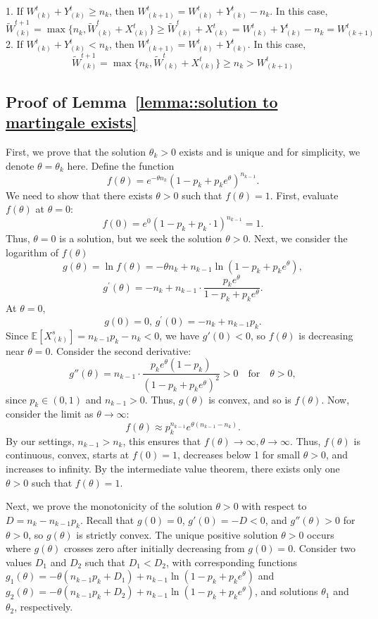 \documentclass[preprint]{article}
\theoremstyle{plain}
\theoremstyle{definition}
\theoremstyle{remark}
\begin{document}
1. If $ W^t_{(k)}+ Y^t_{(k)}\geq n_k $, then $W^t_{(k+1)}= W^{t}_{(k)}+Y^t_{(k)}  -  n_k $. In this case, 
$$ \tilde{W}^{t+1}_{(k)}=  \max\{ n_{k},\tilde{W}^{t}_{(k)} + X^t_{(k)}\} \geq \tilde{W}^{t}_{(k)} + X^t_{(k)}={W}^{t}_{(k)} + Y^t_{(k)}-n_k=W^t_{(k+1)}$$
2. If $ W^t_{(k)}+ Y^t_{(k)}<n_k $, then $W^t_{(k+1)}= W^{t}_{(k)}+Y^t_{(k)}$. In this case, 
$$\tilde{W}^{t+1}_{(k)}=  \max\{ n_{k},\tilde{W}^{t}_{(k)} + X^t_{(k)}\} \geq n_{k}> W^t_{(k+1)}$$

\subsection{Proof of Lemma~\ref{lemma::solution to martingale exists}}\label{appendix_lemma::proof of solution to martingale exists}
First, we prove that the solution $\theta_k>0$ exists and is unique and for simplicity, we denote $\theta=\theta_k$ here. Define the function
\[
f(\theta) = e^{-\theta n_{k}} (1 - p_k + p_k e^{\theta})^{n_{k-1}}.
\]
We need to show that there exists \(\theta > 0\) such that \(f(\theta) = 1\). First, evaluate \(f(\theta)\) at \(\theta = 0\):
\[
f(0) = e^{0} (1 - p_k + p_k \cdot 1)^{n_{k-1}} = 1.
\]
Thus, \(\theta = 0\) is a solution, but we seek the solution \(\theta > 0\). Next, we consider the logarithm of $f(\theta)$
$$g(\theta) = \ln f(\theta) = -\theta n_{k} + n_{k-1} \ln(1 - p_k + p_k e^{\theta}),$$
$$ g^\prime(\theta) = -n_{k} + n_{k-1} \cdot \frac{p_k e^{\theta}}{1 - p_k + p_k e^{\theta}}.$$
At \(\theta = 0\),
\[
g(0)=0,\,g^\prime(0) = -n_{k} + n_{k-1} p_k.
\]
Since \(\mathbb{E}[X^s_{(k)}] = n_{k-1} p_k - n_{k} < 0\), we have \(g'(0) < 0\), so \(f(\theta)\) is decreasing near \(\theta = 0\). Consider the second derivative:
\[
g''(\theta) = n_{k-1} \cdot \frac{p_k e^{\theta} (1 - p_k)}{(1 - p_k + p_k e^{\theta})^2} > 0 \quad \text{for} \quad \theta > 0,
\]
since \(p_k \in (0, 1)\) and \(n_{k-1} > 0\). Thus, \(g(\theta)\) is convex, and so is \(f(\theta)\). Now, consider the limit as \(\theta \to \infty\):
\[
f(\theta) \approx p_k^{n_{k-1}} e^{\theta (n_{k-1} - n_{k})}.
\]
By our settings, $n_{k-1}>n_k$, this ensures that $f(\theta)\to \infty, \theta\to \infty$. Thus, \(f(\theta)\) is continuous, convex, starts at \(f(0) = 1\), decreases below 1 for small \(\theta > 0\), and increases to infinity. By the intermediate value theorem, there exists only one \(\theta > 0\) such that \(f(\theta) = 1\). 

Next, we prove the monotonicity of the solution $\theta>0$ with respect to \(D = n_k - n_{k-1} p_k\). Recall that \(g(0) = 0\), \(g'(0) = -D < 0\), and \(g''(\theta) > 0\) for \(\theta > 0\), so \(g(\theta)\) is strictly convex. The unique positive solution \(\theta > 0\) occurs where \(g(\theta)\) crosses zero after initially decreasing from \(g(0) = 0\). Consider two values \(D_1\) and \(D_2\) such that \(D_1 < D_2\), with corresponding functions \(g_1(\theta) = -\theta (n_{k-1} p_k + D_1) + n_{k-1} \ln(1 - p_k + p_k e^{\theta})\) and \(g_2(\theta) = -\theta (n_{k-1} p_k + D_2) + n_{k-1} \ln(1 - p_k + p_k e^{\theta})\), and solutions \(\theta_1\) and \(\theta_2\), respectively. 
\end{document}
